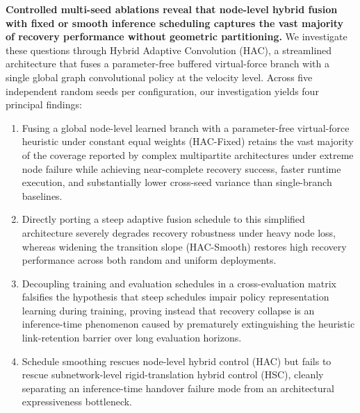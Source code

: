 \documentclass[11pt]{article}
\theoremstyle{plain}
\theoremstyle{definition}
\theoremstyle{remark}
\begin{document}
\textbf{Controlled multi-seed ablations reveal that node-level hybrid fusion with fixed or smooth inference scheduling captures the vast majority of recovery performance without geometric partitioning.} We investigate these questions through Hybrid Adaptive Convolution (HAC), a streamlined architecture that fuses a parameter-free buffered virtual-force branch with a single global graph convolutional policy at the velocity level. Across five independent random seeds per configuration, our investigation yields four principal findings:
\begin{enumerate}[nosep]
  \item Fusing a global node-level learned branch with a parameter-free virtual-force heuristic under constant equal weights (HAC-Fixed) retains the vast majority of the coverage reported by complex multipartite architectures under extreme node failure while achieving near-complete recovery success, faster runtime execution, and substantially lower cross-seed variance than single-branch baselines.
  \item Directly porting a steep adaptive fusion schedule to this simplified architecture severely degrades recovery robustness under heavy node loss, whereas widening the transition slope (HAC-Smooth) restores high recovery performance across both random and uniform deployments.
  \item Decoupling training and evaluation schedules in a cross-evaluation matrix falsifies the hypothesis that steep schedules impair policy representation learning during training, proving instead that recovery collapse is an inference-time phenomenon caused by prematurely extinguishing the heuristic link-retention barrier over long evaluation horizons.
  \item Schedule smoothing rescues node-level hybrid control (HAC) but fails to rescue subnetwork-level rigid-translation hybrid control (HSC), cleanly separating an inference-time handover failure mode from an architectural expressiveness bottleneck.
\end{enumerate}
\end{document}
